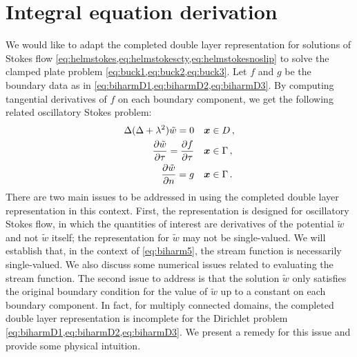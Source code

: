 
\section{Integral equation derivation} \label{sec:anapp}

We would like to adapt the completed double layer representation
for solutions of Stokes flow \cref{eq:helmstokes,eq:helmstokescty,eq:helmstokesnoslip} to solve 
the clamped plate problem \cref{eq:buck1,eq:buck2,eq:buck3}.
Let $f$ and $g$ be the boundary data as in \cref{eq:biharmD1,eq:biharmD2,eq:biharmD3}. 
By computing tangential derivatives of $f$ on each
boundary component, we get the following related oscillatory Stokes
problem:
\begin{align}
 \Delta (\Delta + \lambda^2) \tilde{w}  = 0 &\quad {\boldsymbol x} \in D \, ,\nonumber\\
 \frac{\partial \tilde{w}}{\partial \tau} = 
 \frac{\partial f}{\partial \tau} 
&\quad {\boldsymbol x} \in \Gamma \label{eq:biharm5} \, ,\\ 
 \frac{\partial \tilde{w}}{\partial n} = g &\quad {\boldsymbol x} 
\in \Gamma 
\, . 
\nonumber
\end{align}
There are two main issues to be addressed in using the completed
double layer representation in this context. First,
the representation is designed for 
oscillatory Stokes flow, in which the quantities of interest are derivatives
of the potential $\tilde{w}$ and not $\tilde{w}$ itself; the
representation for $\tilde{w}$ may not be single-valued. 
We will establish that, in the context of \cref{eq:biharm5},
the stream function is necessarily single-valued. We also discuss
some numerical issues related to evaluating the stream function.
The second issue to address
is that the solution $\tilde{w}$ only satisfies the original boundary 
condition for the value of $\tilde{w}$ up to a constant on 
each boundary component.
In fact, for multiply connected domains, the completed double layer 
representation is incomplete for the Dirichlet
problem \cref{eq:biharmD1,eq:biharmD2,eq:biharmD3}. We present a remedy for this 
issue and provide some physical intuition.
%
